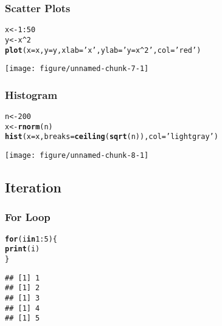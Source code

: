 \documentclass[../../dsa1101_notes.Rtex]{subfiles}\usepackage[]{graphicx}\usepackage[]{color}
\makeatletter
\def\maxwidth{ %
  \ifdim\Gin@nat@width>\linewidth
    \linewidth
  \else
    \Gin@nat@width
  \fi
}
\newcommand{\hlnum}[1]{\textcolor[rgb]{0.686,0.059,0.569}{#1}}%
\newcommand{\hlstr}[1]{\textcolor[rgb]{0.192,0.494,0.8}{#1}}%
\newcommand{\hlopt}[1]{\textcolor[rgb]{0,0,0}{#1}}%
\newcommand{\hlstd}[1]{\textcolor[rgb]{0.345,0.345,0.345}{#1}}%
\newcommand{\hlkwa}[1]{\textcolor[rgb]{0.161,0.373,0.58}{\textbf{#1}}}%
\newcommand{\hlkwb}[1]{\textcolor[rgb]{0.69,0.353,0.396}{#1}}%
\newcommand{\hlkwc}[1]{\textcolor[rgb]{0.333,0.667,0.333}{#1}}%
\newcommand{\hlkwd}[1]{\textcolor[rgb]{0.737,0.353,0.396}{\textbf{#1}}}%
\newenvironment{kframe}{%
 \def\at@end@of@kframe{}%
 \ifinner\ifhmode%
  \def\at@end@of@kframe{\end{minipage}}%
  \begin{minipage}{\columnwidth}%
 \fi\fi%
 \def\FrameCommand##1{\hskip\@totalleftmargin \hskip-\fboxsep
 \colorbox{shadecolor}{##1}\hskip-\fboxsep
     \hskip-\linewidth \hskip-\@totalleftmargin \hskip\columnwidth}%
 \MakeFramed {\advance\hsize-\width
   \@totalleftmargin\z@ \linewidth\hsize
   \@setminipage}}%
 {\par\unskip\endMakeFramed%
 \at@end@of@kframe}
\newenvironment{knitrout}{}{} %
\makeatother
\begin{document}
\subsubsection{Scatter Plots}
\begin{knitrout}
\color{fgcolor}\begin{kframe}
\begin{alltt}
  \hlstd{x} \hlkwb{<-} \hlnum{1}\hlopt{:}\hlnum{50}
\hlstd{y} \hlkwb{<-} \hlstd{x}\hlopt{^}\hlnum{2}
\hlkwd{plot}\hlstd{(}\hlkwc{x} \hlstd{= x,} \hlkwc{y} \hlstd{= y,} \hlkwc{xlab} \hlstd{=} \hlstr{'x'}\hlstd{,} \hlkwc{ylab} \hlstd{=} \hlstr{'y=x^2'}\hlstd{,} \hlkwc{col} \hlstd{=} \hlstr{'red'}\hlstd{)}
\end{alltt}
\end{kframe}
\texttt{[image: figure/unnamed-chunk-7-1]} 
\end{knitrout}
  
  \subsubsection{Histogram}
\begin{knitrout}
\color{fgcolor}\begin{kframe}
\begin{alltt}
  \hlstd{n} \hlkwb{<-} \hlnum{200}
\hlstd{x} \hlkwb{<-} \hlkwd{rnorm}\hlstd{(n)}
\hlkwd{hist}\hlstd{(}\hlkwc{x} \hlstd{= x,} \hlkwc{breaks} \hlstd{=} \hlkwd{ceiling}\hlstd{(}\hlkwd{sqrt}\hlstd{(n)),} \hlkwc{col} \hlstd{=} \hlstr{'lightgray'}\hlstd{)}
\end{alltt}
\end{kframe}
\texttt{[image: figure/unnamed-chunk-8-1]} 
\end{knitrout}
  
  \subsection{Iteration}
\subsubsection{For Loop}
\begin{knitrout}
\color{fgcolor}\begin{kframe}
\begin{alltt}
  \hlkwa{for} \hlstd{(i} \hlkwa{in} \hlnum{1}\hlopt{:}\hlnum{5}\hlstd{) \{}
    \hlkwd{print}\hlstd{(i)}
  \hlstd{\}}
\end{alltt}
\begin{verbatim}
## [1] 1
## [1] 2
## [1] 3
## [1] 4
## [1] 5
\end{verbatim}
\end{kframe}
\end{knitrout}
  
\end{document}

